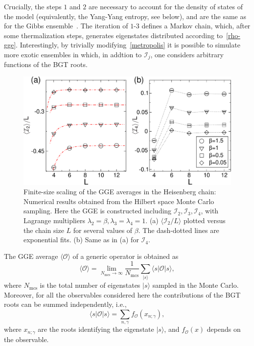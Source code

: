 \documentclass[twocolumn,superscriptaddress,prb,10pt]{revtex4-1}
\begin{document}
Crucially, the steps $1$ and $2$ are necessary to account for the density of states of the model 
(equivalently, the Yang-Yang entropy, see below), 
and are the same as for the Gibbs ensemble~\cite{gu-2005}. The iteration of $1$-$3$ defines a Markov 
chain, which, after some thermalization steps, generates eigenstates distributed according 
to~\eqref{rho-gge}. Interestingly, by trivially modifying~\eqref{metropolis} it is possible to 
simulate more exotic ensembles in which, in addtion to ${\mathcal I}_j$, one considers 
arbitrary functions of the BGT roots.  
%
\begin{figure}[t]
\includegraphics*[width=0.93\linewidth]{./draft_figs/fig3}
\caption{Finite-size scaling of the GGE averages in the Heisenberg chain: Numerical results 
 obtained from the Hilbert space Monte Carlo sampling. Here the GGE is constructed including 
 ${\mathcal I}_2, {\mathcal I}_3, {\mathcal I}_4$, with Lagrange multipliers $\lambda_2=\beta,
 \lambda_3=\lambda_4=1$. (a) $\langle {\mathcal I}_2/L\rangle$ plotted versus the chain size 
 $L$ for several values of $\beta$. The dash-dotted lines are exponential fits. (b) Same as 
 in (a) for ${\mathcal I}_4$.
}
\label{fig2}
\end{figure}
%
The GGE average $\langle{\mathcal O}\rangle$ of a generic operator is obtained as  
%
\begin{equation}
\label{gge-mc}
\langle{\mathcal O}\rangle=\lim\limits_{N_\textrm{mcs}\to\infty}\frac{1}
{N_\textrm{mcs}}\sum\limits_{|s\rangle}\langle s|{\mathcal O}
|s\rangle,
\end{equation}
%
where $N_{\textrm{mcs}}$ is the total number of eigenstates $|s\rangle$ sampled in 
the Monte Carlo. Moreover, for all the observables considered here the contributions 
of the BGT roots can be summed independently, i.e., 
%
\begin{equation}
\label{gge-mc-1}
\langle s|{\mathcal O}|s\rangle=\sum\limits_{n,\gamma}f_{{\mathcal O}}(x_{n;\gamma}), 
\end{equation}
%
where $x_{n;\gamma}$ are the roots identifying the eigenstate $|s\rangle$, and 
$f_{{\mathcal O}}(x)$ depends on the observable. 
\end{document}
